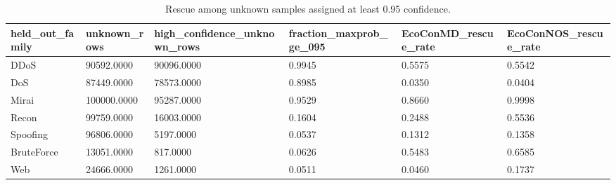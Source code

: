 \begin{table}
\caption{Rescue among unknown samples assigned at least 0.95 confidence.}
\label{tab:table08_overconfident_rescue}
\begin{tabular}{llllll}
\toprule
held\_out\_family & unknown\_rows & high\_confidence\_unknown\_rows & fraction\_maxprob\_ge\_095 & EcoConMD\_rescue\_rate & EcoConNOS\_rescue\_rate \\
\midrule
DDoS & 90592.0000 & 90096.0000 & 0.9945 & 0.5575 & 0.5542 \\
DoS & 87449.0000 & 78573.0000 & 0.8985 & 0.0350 & 0.0404 \\
Mirai & 100000.0000 & 95287.0000 & 0.9529 & 0.8660 & 0.9998 \\
Recon & 99759.0000 & 16003.0000 & 0.1604 & 0.2488 & 0.5536 \\
Spoofing & 96806.0000 & 5197.0000 & 0.0537 & 0.1312 & 0.1358 \\
BruteForce & 13051.0000 & 817.0000 & 0.0626 & 0.5483 & 0.6585 \\
Web & 24666.0000 & 1261.0000 & 0.0511 & 0.0460 & 0.1737 \\
\bottomrule
\end{tabular}
\end{table}
